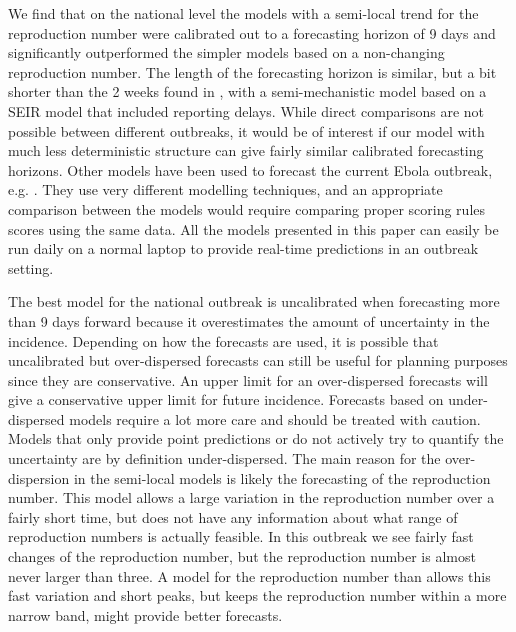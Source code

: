 \documentclass[12pt]{article}
\begin{document}
We find that on the national level the models with a semi-local trend for the reproduction number were calibrated out to a forecasting horizon of 9 days and significantly outperformed the simpler models based on a non-changing reproduction number. The length of the forecasting horizon is similar, but a bit shorter than the 2 weeks found in \cite{funkAssessingPerformanceRealtime2019}, with a semi-mechanistic model based on a SEIR model that included reporting delays. While direct comparisons are not possible between different outbreaks, it would be of interest if our model with much less deterministic structure can give fairly similar calibrated forecasting horizons. Other models have been used to forecast the current Ebola outbreak, e.g. \cite{kellyRealtimePredictions201820192019, akhmetzhanovAnalyzingForecastingEbola2019}. They use very different modelling techniques, and an appropriate comparison between the models would require comparing proper scoring rules scores using the same data. All the models presented in this paper can easily be run daily on a normal laptop to provide real-time predictions in an outbreak setting. 


The best model for the national outbreak is uncalibrated when forecasting more than 9 days forward because it overestimates the amount of uncertainty in the incidence. Depending on how the forecasts are used, it is possible that uncalibrated but over-dispersed forecasts can still be useful for planning purposes since they are conservative. An upper limit for an over-dispersed forecasts will give a conservative upper limit for future incidence. Forecasts based on under-dispersed models require a lot more care and should be treated with caution. Models that only provide point predictions or do not actively try to quantify the uncertainty are by definition under-dispersed. The main reason for the over-dispersion in the semi-local models is likely the forecasting of the reproduction number. This model allows a large variation in the reproduction number over a fairly short time, but does not have any information about what range of reproduction numbers is actually feasible. In this outbreak we see fairly fast changes of the reproduction number, but the reproduction number is almost never larger than three. A model for the reproduction number than allows this fast variation and short peaks, but keeps the reproduction number within a more narrow band, might provide better forecasts.
\end{document}
